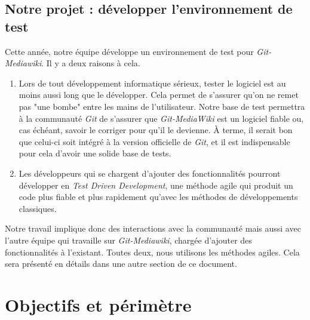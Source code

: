 \documentclass[11pt]{article}
\begin{document}
\subsection{Notre projet : développer l'environnement de test}
Cette année, notre équipe développe un environnement de test pour \textit{Git-Mediawiki}. Il y a deux raisons à cela.
\begin{enumerate}
\item Lors de tout développement informatique sérieux, tester le logiciel est au moins aussi long que le développer. Cela permet de s'assurer qu'on ne remet pas "une bombe" entre les mains de l'utilisateur. Notre base de test permettra à la communauté \textit{Git} de s'assurer que \textit{Git-MediaWiki} est un logiciel fiable ou, cas échéant, savoir le corriger pour qu'il le devienne. À terme, il serait bon que celui-ci soit intégré à la version officielle de \textit{Git}, et il est indispensable pour cela d'avoir une solide base de tests.
\item Les développeurs qui se chargent d'ajouter des fonctionnalités pourront développer en \textit{Test Driven Development}, une méthode agile qui produit un code plus fiable et plus rapidement qu'avec les méthodes de développements classiques.
\end{enumerate}
Notre travail implique donc des interactions avec la communauté mais aussi avec l'autre équipe qui travaille sur \textit{Git-Mediawiki}, chargée d'ajouter des fonctionnalités à l'existant. Toutes deux, nous utilisons les méthodes agiles. Cela sera présenté en détails dans une autre section de ce document.

\section{Objectifs et périmètre}
\end{document}
